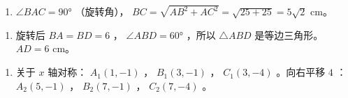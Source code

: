 \begin{answer}
\begin{enumerate}
  \item $\angle BAC = 90°$ （旋转角）， $BC = \sqrt{AB^2 + AC^2} = \sqrt{25 + 25} = 5\sqrt{2}$ cm。
\end{enumerate}


\begin{enumerate}
  \item 旋转后 $BA = BD = 6$ ， $\angle ABD = 60°$ ，所以 $\triangle ABD$ 是等边三角形。 $AD = 6$ cm。
\end{enumerate}


\begin{enumerate}
  \item 关于 $x$ 轴对称： $A_1(1, -1)$ ， $B_1(3, -1)$ ， $C_1(3, -4)$ 。向右平移 $4$ ： $A_2(5, -1)$ ， $B_2(7, -1)$ ， $C_2(7, -4)$ 。
\end{enumerate}


\end{answer}
